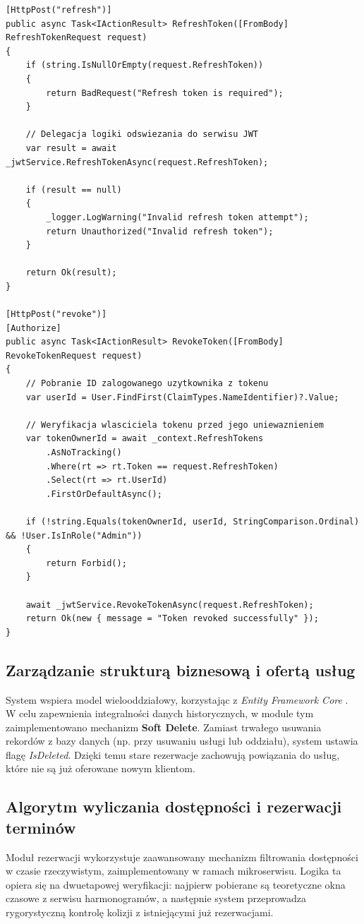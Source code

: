 \begin{lstlisting}[language={[Sharp]C}, caption={Implementacja punktów końcowych do zarządzania sesją (RefreshTokenController.cs)}]
[HttpPost("refresh")]
public async Task<IActionResult> RefreshToken([FromBody] RefreshTokenRequest request)
{
    if (string.IsNullOrEmpty(request.RefreshToken))
    {
        return BadRequest("Refresh token is required");
    }
    
    // Delegacja logiki odswiezania do serwisu JWT
    var result = await _jwtService.RefreshTokenAsync(request.RefreshToken);
    
    if (result == null)
    {
        _logger.LogWarning("Invalid refresh token attempt");
        return Unauthorized("Invalid refresh token");
    }
    
    return Ok(result);
}

[HttpPost("revoke")]
[Authorize]
public async Task<IActionResult> RevokeToken([FromBody] RevokeTokenRequest request)
{
    // Pobranie ID zalogowanego uzytkownika z tokenu
    var userId = User.FindFirst(ClaimTypes.NameIdentifier)?.Value;
    
    // Weryfikacja wlasciciela tokenu przed jego uniewaznieniem
    var tokenOwnerId = await _context.RefreshTokens
        .AsNoTracking()
        .Where(rt => rt.Token == request.RefreshToken)
        .Select(rt => rt.UserId)
        .FirstOrDefaultAsync();

    if (!string.Equals(tokenOwnerId, userId, StringComparison.Ordinal) && !User.IsInRole("Admin"))
    {
        return Forbid();
    }

    await _jwtService.RevokeTokenAsync(request.RefreshToken);
    return Ok(new { message = "Token revoked successfully" });
}
\end{lstlisting}

\subsection{Zarządzanie strukturą biznesową i ofertą usług}
System wspiera model wielooddziałowy, korzystając z \textit{Entity Framework Core} \cite{ef_core_testing}. W celu zapewnienia integralności danych historycznych, w module tym zaimplementowano mechanizm \textbf{Soft Delete}. Zamiast trwałego usuwania rekordów z bazy danych (np. przy usuwaniu usługi lub oddziału), system ustawia flagę \textit{IsDeleted}. Dzięki temu stare rezerwacje zachowują powiązania do usług, które nie są już oferowane nowym klientom.

\subsection{Algorytm wyliczania dostępności i rezerwacji terminów}
Moduł rezerwacji wykorzystuje zaawansowany mechanizm filtrowania dostępności w czasie rzeczywistym, zaimplementowany w ramach mikroserwisu. Logika ta opiera się na dwuetapowej weryfikacji: najpierw pobierane są teoretyczne okna czasowe z serwisu harmonogramów, a następnie system przeprowadza rygorystyczną kontrolę kolizji z istniejącymi już rezerwacjami.

